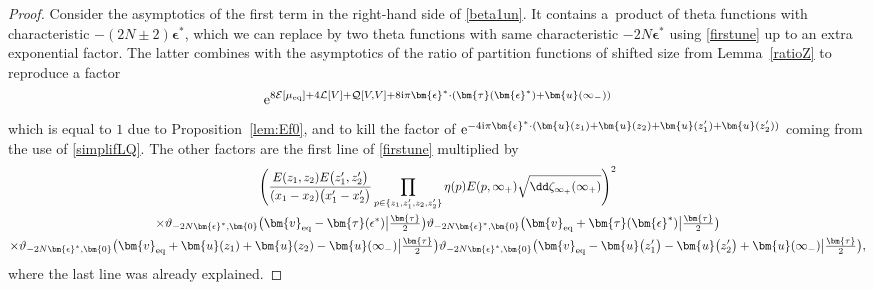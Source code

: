 \documentclass[10pt,a4paper]{amsart}
\numberwithin{equation}{section}
\begin{document}
\begin{proof}
Consider the asymptotics of the first term in the right-hand side of \eqref{beta1un}. It contains a~product of theta functions with characteristic $-(2N \pm 2)\bm{\epsilon}^*$, which we can replace by two theta functions with same characteristic $-2N\bm{\epsilon}^*$ using \eqref{firstune} up to an extra exponential factor. The latter combines with the asymptotics of the ratio of partition functions of shifted size from Lemma~\ref{ratioZ} to reproduce a factor
\[
{\rm e}^{8\mathcal{E}[\mu_{{\rm eq}}] + 4\mathcal{L}[V] + \mathcal{Q}[V,V] + 8{\rm i}\pi \bm{\epsilon}^* \cdot (\bm{\tau}(\bm{\epsilon}^*) + \bm{u}(\infty_-))}
\]
which is equal to $1$ due to Proposition~\ref{lem:Ef0}, and to kill the factor of ${\rm e}^{-4{\rm i}\pi \bm{\epsilon}^*\cdot(\bm{u}(z_1)+\bm{u}(z_2) + \bm{u}(z_1') + \bm{u}(z_2'))}$ coming from the use of \eqref{simplifLQ}. The other factors are the first line of \eqref{firstune} multiplied by
\begin{gather*}
 \Biggl(\frac{E(z_1,z_2)E\bigl(z_1',z_2'\bigr)}{(x_1 - x_2)\bigl(x_1' - x_2'\bigr)} \prod_{p \in \{z_1,z'_1,z_2,z_2'\}} \eta(p)E(p,\infty_+)\sqrt{\dd\zeta_{\infty_+}(\infty_+)}\Biggr)^2 \\
 \times \vartheta_{-2N\bm{\epsilon}^*,\bm{0}}\bigl(\bm{v}_{{\rm eq}} - \bm{\tau}(\epsilon^*)\big|\tfrac{\bm{\tau}}{2}\bigr) \vartheta_{-2N\bm{\epsilon}^*,\bm{0}}\bigl(\bm{v}_{{\rm eq}} + \bm{\tau}(\bm{\epsilon}^*)\big|\tfrac{\bm{\tau}}{2}\bigr) \\
 \times \vartheta_{-2N\bm{\epsilon}^*,\bm{0}}\bigl(\bm{v}_{{\rm eq}} + \bm{u}(z_1) + \bm{u}(z_2) - \bm{u}(\infty_-)\big|\tfrac{\bm{\tau}}{2}\bigr) \vartheta_{-2N\bm{\epsilon}^*,\bm{0}}\bigl(\bm{v}_{{\rm eq}} - \bm{u}\bigl(z_1'\bigr) - \bm{u}\bigl(z_2'\bigr) + \bm{u}(\infty_-)\big|\tfrac{\bm{\tau}}{2}\bigr),
\end{gather*}
where the last line was already explained.




\end{proof}
\end{document}
